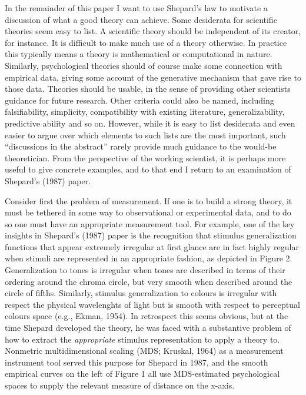 \documentclass[english,doc]{apa6}
\begin{document}
\noindent
In the remainder of this paper I want to use Shepard's law to motivate a discussion of what a good theory can achieve. Some desiderata for scientific theories seem easy to list. A scientific theory should be independent of its creator, for instance. It is difficult to make much use of a theory otherwise. In practice this typically means a theory is mathematical or computational in nature. Similarly, psychological theories should of course make some connection with empirical data, giving some account of the generative mechanism that gave rise to those data. Theories should be usable, in the sense of providing other scientists guidance for future research. Other criteria could also be named, including falsifiability, simplicity, compatibility with existing literature, generalizability, predictive ability and so on. However, while it is easy to list desiderata and even easier to argue over which elements to such lists are the most important, such ``discussions in the abstract'' rarely provide much guidance to the would-be theoretician. From the perspective of the working scientist, it is perhaps more useful to give concrete examples, and to that end I return to an examination of Shepard's (1987) paper.

Consider first the problem of measurement. If one is to build a strong theory, it must be tethered in some way to observational or experimental data, and to do so one must have an appropriate measurement tool. For example, one of the key insights in Shepard's (1987) paper is the recognition that stimulus generalization functions that appear extremely irregular at first glance are in fact highly regular when stimuli are represented in an appropriate fashion, as depicted in Figure 2. Generalization to tones is irregular when tones are described in terms of their ordering around the chroma circle, but very smooth when described around the circle of fifths. Similarly, stimulus generalization to colours is irregular with respect the physical wavelenghts of light but is smooth with respect to perceptual colours space (e.g., Ekman, 1954). In retrospect this seems obvious, but at the time Shepard developed the theory, he was faced with a substantive problem of how to extract the \emph{appropriate} stimulus representation to apply a theory to. Nonmetric multidimensional scaling (MDS; Kruskal, 1964) as a measurement instrument tool served this purpose for Shepard in 1987, and the smooth empirical curves on the left of Figure 1 all use MDS-estimated psychological spaces to supply the relevant measure of distance on the x-axis.
\end{document}
